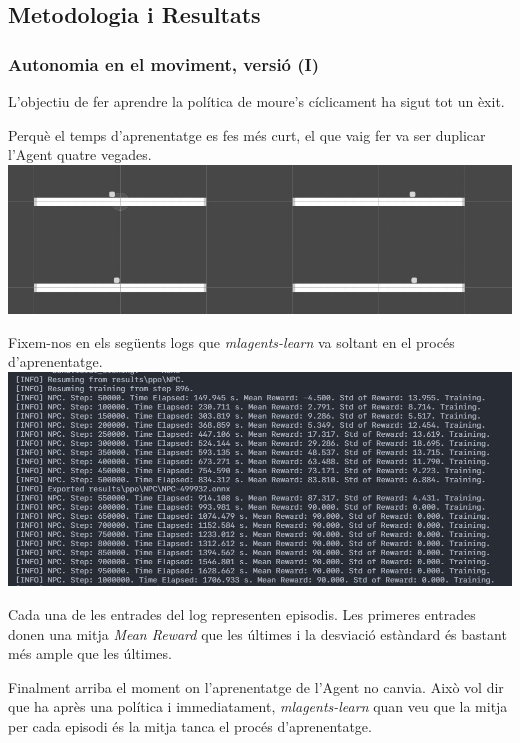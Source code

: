 \documentclass{article}
\begin{document}
   \newpage
    
    \subsection{Metodologia i Resultats}
    
    \subsubsection{Autonomia en el moviment, versió (I)}
    L'objectiu de fer aprendre la política de moure's cíclicament ha sigut tot un èxit.
    
    Perquè el temps d'aprenentatge es fes més curt, el que vaig fer va ser duplicar l'Agent quatre vegades. \\
        
    \includegraphics[width=\textwidth]{images/v1/autonomia_v1.jpeg}
    
    Fixem-nos en els següents logs que \textit{mlagents-learn} va soltant en el procés d'aprenentatge. \\
    
    \includegraphics[width=\textwidth]{images/v1/log_v1.jpeg}
    
    Cada una de les entrades del log representen episodis. Les primeres entrades donen una mitja \textit{Mean Reward} que les últimes i la desviació estàndard és bastant més ample que les últimes.
    
    Finalment arriba el moment on l'aprenentatge de l'Agent no canvia. Això vol dir que ha après una política i immediatament, \textit{mlagents-learn} quan veu que la mitja per cada episodi és la mitja tanca el procés d'aprenentatge.
    
\end{document}
